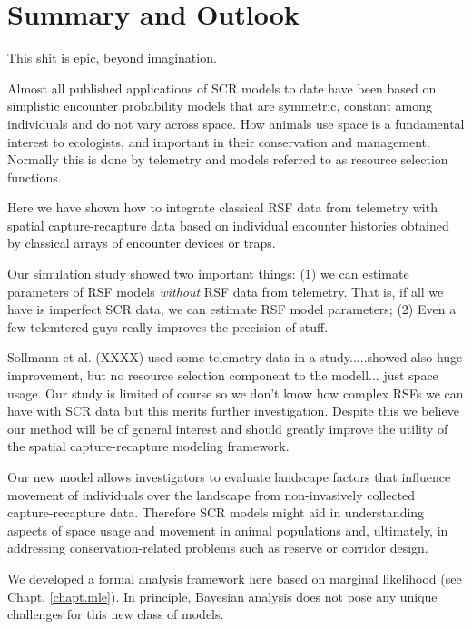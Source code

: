 \section{Summary and Outlook}

This shit is epic, beyond imagination.

Almost
all published applications of SCR models to date have been based on
simplistic encounter probability models that are symmetric, constant among
individuals and  do not vary across space. How animals use space is a
fundamental interest to ecologists, and important in their
conservation and management. Normally this is done by telemetry and
models referred to as resource selection functions.

Here we have shown how to integrate classical RSF data from telemetry
with spatial capture-recapture data based on individual encounter
histories obtained by classical arrays of encounter devices or traps.

Our simulation study showed two important things:
(1) we can estimate parameters of RSF models {\it without} RSF data
from telemetry. That is, if all we have is imperfect SCR data, we can
estimate RSF model parameters;
(2) Even a few telemtered guys really
improves the precision of stuff.

Sollmann et al. (XXXX) used some telemetry data in a study.....showed
also huge improvement, but no resource selection component to the
modell... just space usage.
Our study is limited of course so we don't know how complex RSFs we
can have with SCR data but this merits further investigation. Despite
this we believe our method will be of general interest and should
greatly improve the utility of the spatial capture-recapture modeling
framework.


Our new model allows investigators to evaluate landscape factors that
influence movement of individuals over the landscape from
non-invasively collected capture-recapture data.  Therefore SCR models
might aid in understanding aspects of space usage and movement in
animal populations and, ultimately, in addressing conservation-related
problems such as reserve or corridor design.

We developed a formal analysis framework here based on 
marginal likelihood \citep{borchers_efford:2008}
(see Chapt. \ref{chapt.mle}).
In principle,
Bayesian analysis does not pose any unique challenges for this new
class of models.

